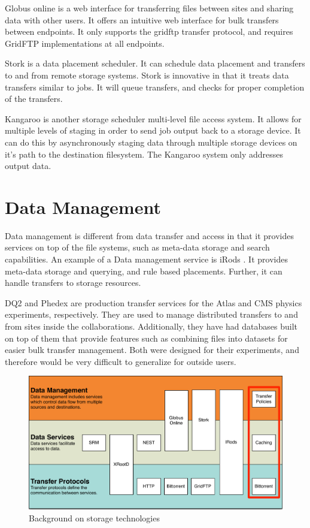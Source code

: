 Globus online \cite{foster2011globus} is a web interface for transferring files between sites and sharing data with other users.  It offers an intuitive web interface for bulk transfers between endpoints.  It only supports the gridftp \cite{allcock2005globus} transfer protocol, and requires GridFTP implementations at all endpoints.

Stork \cite{kosar2004stork} is a data placement scheduler.  It can schedule data placement and transfers to and from remote storage systems.  Stork is innovative in that it treats data transfers similar to jobs.  It will queue transfers, and checks for proper completion of the transfers.

Kangaroo \cite{thain2001kangaroo} is another storage scheduler multi-level file access system.  It allows for multiple levels of staging in order to send job output back to a storage device.  It can do this by asynchronously staging data through multiple storage devices on it's path to the destination filesystem.  The Kangaroo system only addresses output data.

\section{Data Management}

Data management is different from data transfer and access in that it provides services on top of the file systems, such as meta-data storage and search capabilities.  An example of a Data management service is iRods \cite{rajasekar2010irods}.  It provides meta-data storage and querying, and rule based placements.  Further, it can handle transfers to storage resources.

DQ2 \cite{branco2008managing} and Phedex \cite{rehn2006phedex} are production transfer services for the Atlas and CMS physics experiments, respectively.  They are used to manage distributed transfers to and from sites inside the collaborations.  Additionally, they have had databases built on top of them that provide features such as combining files into datasets for easier bulk transfer management.  Both were designed for their experiments, and therefore would be very difficult to generalize for outside users.

\begin{figure}[ht!]
	\centering
	\includegraphics[width=\textwidth]{images/BackgroundStorageDiagram2.pdf}
	\caption{Background on storage technologies}
	\label{fig:backgroundstorage}
\end{figure}


